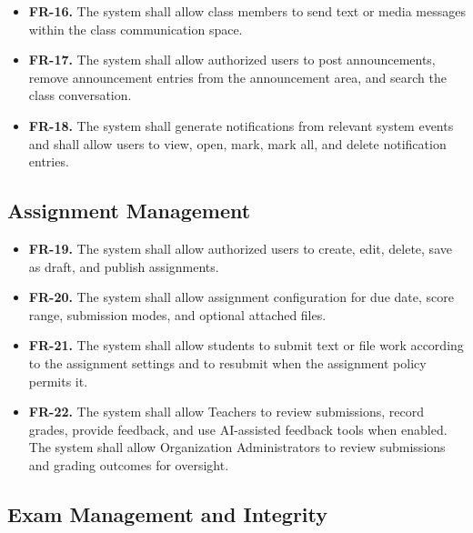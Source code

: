 \begin{itemize}
  \item \textbf{FR-16.} The system shall allow class members to send text or
    media messages within the class communication space.
  \item \textbf{FR-17.} The system shall allow authorized users to post
    announcements, remove announcement entries from the announcement area, and
    search the class conversation.
  \item \textbf{FR-18.} The system shall generate notifications from relevant
    system events and shall allow users to view, open, mark, mark all, and
    delete notification entries.
\end{itemize}

\subsection*{Assignment Management}

\begin{itemize}
  \item \textbf{FR-19.} The system shall allow authorized users to create,
    edit, delete, save as draft, and publish assignments.
  \item \textbf{FR-20.} The system shall allow assignment configuration for
    due date, score range, submission modes, and optional attached files.
  \item \textbf{FR-21.} The system shall allow students to submit text or file work according to the assignment settings and to resubmit when the assignment policy permits it.
  \item \textbf{FR-22.} The system shall allow Teachers to review submissions,
    record grades, provide feedback, and use AI-assisted feedback tools when
    enabled. The system shall allow Organization Administrators to review
    submissions and grading outcomes for oversight.
\end{itemize}

\subsection*{Exam Management and Integrity}

